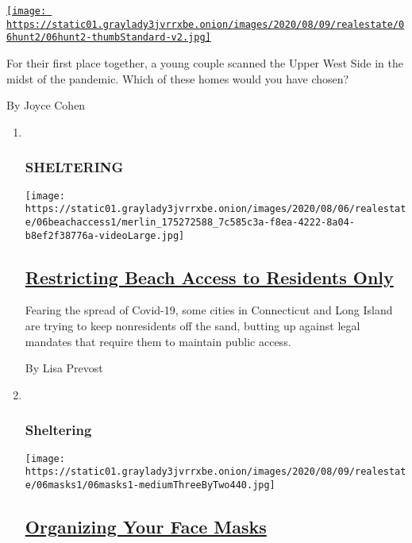 \begin{enumerate}
\begin{enumerate}
    \href{/interactive/2020/08/06/realestate/06hunt-rogala.html}{\texttt{[image: https://static01.graylady3jvrrxbe.onion/images/2020/08/09/realestate/06hunt2/06hunt2-thumbStandard-v2.jpg]}}

    For their first place together, a young couple scanned the Upper
    West Side in the midst of the pandemic. Which of these homes would
    you have chosen?

    By Joyce Cohen
  \end{enumerate}
\end{enumerate}

\begin{enumerate}
\def\labelenumi{\arabic{enumi}.}
\item ~
  \hypertarget{sheltering}{%
  \subsubsection{SHELTERING}\label{sheltering}}

  \texttt{[image: https://static01.graylady3jvrrxbe.onion/images/2020/08/06/realestate/06beachaccess1/merlin\_175272588\_7c585c3a-f8ea-4222-8a04-b8ef2f38776a-videoLarge.jpg]}

  \hypertarget{restricting-beach-access-to-residents-only}{%
  \subsection{\texorpdfstring{\href{/2020/08/06/realestate/connecticut-long-island-beach-restrictions.html}{Restricting
  Beach Access to Residents
  Only}}{Restricting Beach Access to Residents Only}}\label{restricting-beach-access-to-residents-only}}

  Fearing the spread of Covid-19, some cities in Connecticut and Long
  Island are trying to keep nonresidents off the sand, butting up
  against legal mandates that require them to maintain public access.

  By Lisa Prevost
\item ~
  \hypertarget{sheltering-1}{%
  \subsubsection{Sheltering}\label{sheltering-1}}

  \texttt{[image: https://static01.graylady3jvrrxbe.onion/images/2020/08/09/realestate/06masks1/06masks1-mediumThreeByTwo440.jpg]}

  \hypertarget{organizing-your-face-masks}{%
  \subsection{\texorpdfstring{\href{/2020/08/06/realestate/coronavirus-face-mask-organizers.html}{Organizing
  Your Face
  Masks}}{Organizing Your Face Masks}}\label{organizing-your-face-masks}}


\end{enumerate}
